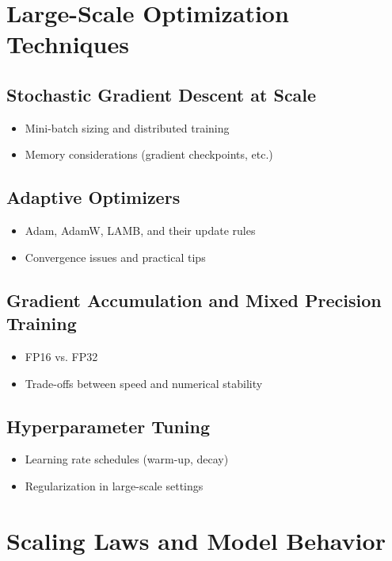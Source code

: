 \documentclass[12pt]{book}
\begin{document}
\chapter{Large-Scale Optimization Techniques}
\section{Stochastic Gradient Descent at Scale}
\begin{itemize}
    \item Mini-batch sizing and distributed training
    \item Memory considerations (gradient checkpoints, etc.)
\end{itemize}

\section{Adaptive Optimizers}
\begin{itemize}
    \item Adam, AdamW, LAMB, and their update rules
    \item Convergence issues and practical tips
\end{itemize}

\section{Gradient Accumulation and Mixed Precision Training}
\begin{itemize}
    \item FP16 vs. FP32
    \item Trade-offs between speed and numerical stability
\end{itemize}

\section{Hyperparameter Tuning}
\begin{itemize}
    \item Learning rate schedules (warm-up, decay)
    \item Regularization in large-scale settings
\end{itemize}


\chapter{Scaling Laws and Model Behavior}
\end{document}
